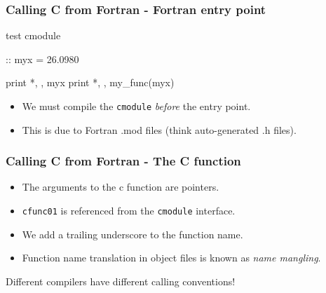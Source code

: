 \documentclass[smaller,table]{beamer} %
\begin{document}
\begin{frame}[fragile]
\frametitle{Calling C from Fortran - Fortran entry point}
\begin{semiverbatim}
\small
{} test
    cmodule
   
    :: myx = 26.0980
   
   print *, , myx
   print *, , my_func(myx)
\end{semiverbatim}
\begin{itemize}
\item We must compile the {\tt cmodule} \emph{before} the entry point.
\item This is due to Fortran .mod files (think auto-generated .h files).
\end{itemize}
\end{frame}

\begin{frame}[fragile]
\frametitle{Calling C from Fortran - The C function}
\begin{itemize}
\item The arguments to the c function are pointers.
\item {\tt cfunc01} is referenced from the {\tt cmodule} interface.
\item We add a trailing underscore to the function name.
\item Function name translation in object files is known as \emph{name mangling}.
\end{itemize}
\begin{alertblock}{}
\begin{center}
Different compilers have different calling conventions!
\end{center}
\end{alertblock}
\end{frame}
\end{document}
